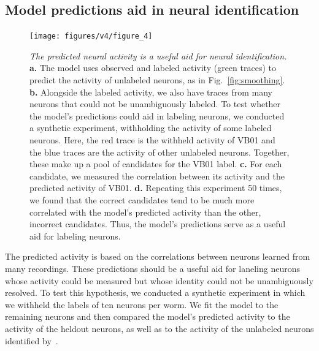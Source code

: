 \documentclass[11pt]{article}
\begin{document}
\subsection*{Model predictions aid in neural identification}

\begin{figure}[t!]
\centering
\texttt{[image: figures/v4/figure\_4]} 
\caption{ \textit{The predicted neural activity is a useful aid for
    neural identification.}  \textbf{a.} The model uses observed and
  labeled activity (green traces) to predict the activity of unlabeled
  neurons, as in Fig.~\ref{fig:smoothing}. \textbf{b.} Alongside the
  labeled activity, we also have traces from many neurons that could
  not be unambiguously labeled. To test whether the model's
  predictions could aid in labeling neurons, we conducted a synthetic
  experiment, withholding the activity of some labeled neurons. Here,
  the red trace is the withheld activity of VB01 and the blue traces
  are the activity of other unlabeled neurons.  Together, these make
  up a pool of candidates for the VB01 label.  \textbf{c.} For each
  candidate, we measured the correlation between its activity and the
  predicted activity of VB01.  \textbf{d.} Repeating this experiment
  50 times, we found that the correct candidates tend to be much more
  correlated with the model's predicted activity than the other,
  incorrect candidates.  Thus, the model's predictions serve as a
  useful aid for labeling neurons.  }
\label{fig:id}
\end{figure}

The predicted activity is based on the correlations between neurons
learned from many recordings.  These predictions should be a useful
aid for laneling neurons whose activity could be measured but whose
identity could not be unambiguously resolved.  To test this
hypothesis, we conducted a synthetic experiment in which we withheld
the labels of ten neurons per worm.  We fit the model to the remaining
neurons and then compared the model's predicted activity to the
activity of the heldout neurons, as well as to the activity of the
unlabeled neurons identified by~\citet{kato2015global}.
\end{document}
